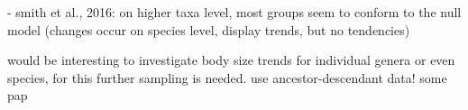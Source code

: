 - smith et al., 2016: on higher taxa level, most groups seem to conform to the null model (changes occur on species level, display trends, but no tendencies)


would be interesting to investigate body size trends for individual genera or even species, for this further sampling is needed. use ancestor-descendant data! 
some pap
